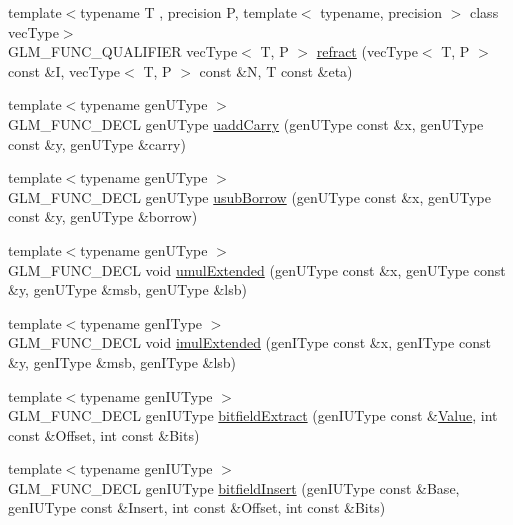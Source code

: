\begin{DoxyCompactItemize}
\item 
{\footnotesize template$<$typename T , precision P, template$<$ typename, precision $>$ class vec\+Type$>$ }\\G\+L\+M\+\_\+\+F\+U\+N\+C\+\_\+\+Q\+U\+A\+L\+I\+F\+I\+ER vec\+Type$<$ T, P $>$ \hyperlink{group__core__func__geometric_ga99d8ddb244b129892babaca9778206d0}{refract} (vec\+Type$<$ T, P $>$ const \&I, vec\+Type$<$ T, P $>$ const \&N, T const \&eta)
\item 
{\footnotesize template$<$typename gen\+U\+Type $>$ }\\G\+L\+M\+\_\+\+F\+U\+N\+C\+\_\+\+D\+E\+CL gen\+U\+Type \hyperlink{group__core__func__integer_ga19276bb7adbe9f0d74515ae49e40b481}{uadd\+Carry} (gen\+U\+Type const \&x, gen\+U\+Type const \&y, gen\+U\+Type \&carry)
\item 
{\footnotesize template$<$typename gen\+U\+Type $>$ }\\G\+L\+M\+\_\+\+F\+U\+N\+C\+\_\+\+D\+E\+CL gen\+U\+Type \hyperlink{group__core__func__integer_gae5b4a6cefd1e21fd2e1b8526b4c964a7}{usub\+Borrow} (gen\+U\+Type const \&x, gen\+U\+Type const \&y, gen\+U\+Type \&borrow)
\item 
{\footnotesize template$<$typename gen\+U\+Type $>$ }\\G\+L\+M\+\_\+\+F\+U\+N\+C\+\_\+\+D\+E\+CL void \hyperlink{group__core__func__integer_gad991bf53779a4309a920bb7bfcf2639c}{umul\+Extended} (gen\+U\+Type const \&x, gen\+U\+Type const \&y, gen\+U\+Type \&msb, gen\+U\+Type \&lsb)
\item 
{\footnotesize template$<$typename gen\+I\+Type $>$ }\\G\+L\+M\+\_\+\+F\+U\+N\+C\+\_\+\+D\+E\+CL void \hyperlink{group__core__func__integer_ga7d284e3ea5059cae9fe8f0fe1a76dd02}{imul\+Extended} (gen\+I\+Type const \&x, gen\+I\+Type const \&y, gen\+I\+Type \&msb, gen\+I\+Type \&lsb)
\item 
{\footnotesize template$<$typename gen\+I\+U\+Type $>$ }\\G\+L\+M\+\_\+\+F\+U\+N\+C\+\_\+\+D\+E\+CL gen\+I\+U\+Type \hyperlink{group__core__func__integer_ga251d309beb171bf95117d2c301b2ad8b}{bitfield\+Extract} (gen\+I\+U\+Type const \&\hyperlink{document_8h_a071cf97155ba72ac9a1fc4ad7e63d481}{Value}, int const \&Offset, int const \&Bits)
\item 
{\footnotesize template$<$typename gen\+I\+U\+Type $>$ }\\G\+L\+M\+\_\+\+F\+U\+N\+C\+\_\+\+D\+E\+CL gen\+I\+U\+Type \hyperlink{group__core__func__integer_ga7ab09972d52094d97d2480982e657dd0}{bitfield\+Insert} (gen\+I\+U\+Type const \&Base, gen\+I\+U\+Type const \&Insert, int const \&Offset, int const \&Bits)

\end{DoxyCompactItemize}
